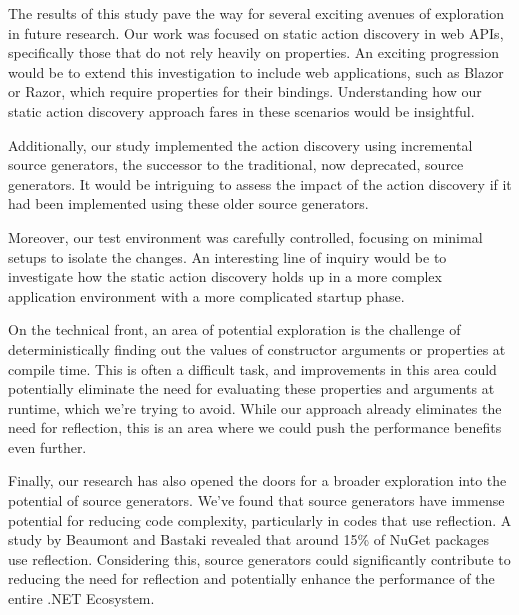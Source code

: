 The results of this study pave the way for several exciting avenues of exploration in future research. Our work was focused on static action discovery in web APIs, specifically those that do not rely heavily on properties. An exciting progression would be to extend this investigation to include web applications, such as Blazor or Razor, which require properties for their bindings. Understanding how our static action discovery approach fares in these scenarios would be insightful.

Additionally, our study implemented the action discovery using incremental source generators, the successor to the traditional, now deprecated, source generators. It would be intriguing to assess the impact of the action discovery if it had been implemented using these older source generators.

Moreover, our test environment was carefully controlled, focusing on minimal setups to isolate the changes. An interesting line of inquiry would be to investigate how the static action discovery holds up in a more complex application environment with a more complicated startup phase.

On the technical front, an area of potential exploration is the challenge of deterministically finding out the values of constructor arguments or properties at compile time. This is often a difficult task, and improvements in this area could potentially eliminate the need for evaluating these properties and arguments at runtime, which we're trying to avoid. While our approach already eliminates the need for reflection, this is an area where we could push the performance benefits even further.

Finally, our research has also opened the doors for a broader exploration into the potential of source generators. We've found that source generators have immense potential for reducing code complexity, particularly in codes that use reflection. A study by Beaumont and Bastaki \cite{Beaumont2022} revealed that around 15\% of NuGet packages use reflection. Considering this, source generators could significantly contribute to reducing the need for reflection and potentially enhance the performance of the entire .NET Ecosystem.
